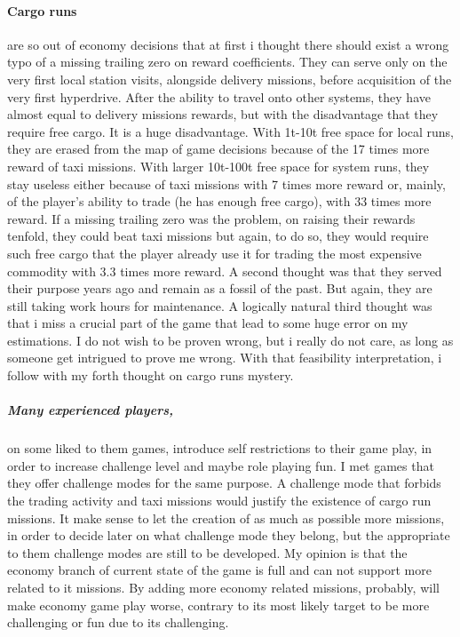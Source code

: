 \documentclass[]{article}
\begin{document}
\paragraph{Cargo runs} are so out of economy decisions that at first i thought there should exist a wrong typo of a missing trailing zero on reward coefficients. They can serve only on the very first local station visits, alongside delivery missions, before acquisition of the very first hyperdrive. After the ability to travel onto other systems, they have almost equal to delivery missions rewards, but with the disadvantage that they require free cargo. It is a huge disadvantage. With 1t-10t free space for local runs, they are erased from the map of game decisions because of the 17 times more reward of taxi missions. With larger 10t-100t free space for system runs, they stay useless either because of taxi missions with 7 times more reward or, mainly, of the player's ability to trade (he has enough free cargo), with 33 times more reward. If a missing trailing zero was the problem, on raising their rewards tenfold, they could beat taxi missions but again, to do so, they would require such free cargo that the player already use it for trading the most expensive commodity with 3.3 times more reward. A second thought was that they served their purpose years ago and remain as a fossil of the past. But again, they are still taking work hours for maintenance. A logically natural third thought was that i miss a crucial part of the game that lead to some huge error on my estimations. I do not wish to be proven wrong, but i really do not care, as long as someone get intrigued to prove me wrong. With that feasibility interpretation, i follow with my forth thought on cargo runs mystery.
\subparagraph*{Many experienced players,} on some liked to them games, introduce self restrictions to their game play, in order to increase challenge level and maybe role playing fun. I met games that they offer challenge modes for the same purpose. A challenge mode that forbids the trading activity and taxi missions would justify the existence of cargo run missions. It make sense to let the creation of as much as possible more missions, in order to decide later on what challenge mode they belong, but the appropriate to them challenge modes are still to be developed. My opinion is that the economy branch of current state of the game is full and can not support more related to it missions. By adding more economy related missions, probably, will make economy game play worse, contrary to its most likely target to be more challenging or fun due to its challenging.
\end{document}
